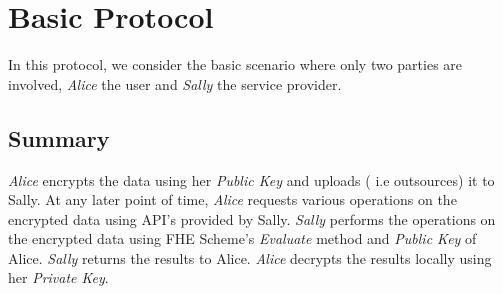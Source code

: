 \documentclass[conference]{IEEEtran}
\numberwithin{equation}{section}
\begin{document}
\section{Basic Protocol}
In this protocol, we consider the basic scenario where only two parties are involved,  \emph{Alice}  the user and \emph{Sally}  the service provider.
\subsection{Summary}
 \emph{Alice} encrypts the data using her \emph{Public Key} and uploads ( i.e outsources) it to Sally. At any later point of time, \emph{Alice} requests various operations on the encrypted data using API's provided by Sally. \emph{Sally}  performs the operations  on the encrypted data using FHE Scheme's \emph{Evaluate} method and \emph{Public Key} of Alice. \emph{Sally}  returns the results to Alice. \emph{Alice} decrypts the results locally using her \emph{Private Key}.
 
\end{document}
